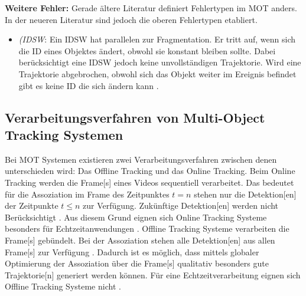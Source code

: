 \textbf{Weitere Fehler:}
Gerade ältere Literatur definiert Fehlertypen im \gls{MOT} anders. In der neueren Literatur sind jedoch die oberen Fehlertypen etabliert.

\begin{itemize}
    \item \textit{(\gls{IDSW}}: Ein \gls{IDSW} hat parallelen zur Fragmentation. Er tritt auf, wenn sich die \gls{ID} eines Objektes ändert, obwohl sie konstant bleiben sollte. Dabei berücksichtigt eine \gls{IDSW} jedoch keine unvollständigen \gls{Trajektorie}. Wird eine \gls{Trajektorie} abgebrochen, obwohl sich das Objekt weiter im \gls{Ereignis} befindet gibt es keine \acrshort{ID} die sich ändern kann \cite{CLEAR.2008, HOTA, IDF1}.
\end{itemize}

\subsection{Verarbeitungsverfahren von Multi-Object Tracking Systemen} \label{sec:MOT Verarbeitungsverfahren}
Bei \gls{MOT} Systemen existieren zwei Verarbeitungsverfahren zwischen denen unterschieden wird: Das \gls{Offline Tracking} und das \gls{Online Tracking}. Beim \gls{Online Tracking} werden die \gls{Frame}[s] eines Videos sequentiell verarbeitet. Das bedeutet für die \gls{Assoziation} im \gls{Frame} des Zeitpunktes \(t=n\) stehen nur die \gls{Detektion}[en] der Zeitpunkte \(t \leq n\)  zur Verfügung. Zukünftige \gls{Detektion}[en] werden nicht Berücksichtigt \cite{Luo.2022}. Aus diesem Grund eignen sich \gls{Online Tracking} Systeme besonders für Echtzeitanwendungen \cite{Bewley.2016}. \gls{Offline Tracking} Systeme verarbeiten die \gls{Frame}[s] gebündelt. Bei der \gls{Assoziation} stehen alle \gls{Detektion}[en] aus allen \gls{Frame}[s] zur Verfügung \cite{Luo.2022}. Dadurch ist es möglich, dass mittels globaler Optimierung der \gls{Assoziation} über die \gls{Frame}[s] qualitativ besonders gute \gls{Trajektorie}[n] generiert werden können. Für eine Echtzeitverarbeitung eignen sich \gls{Offline Tracking} Systeme nicht \cite{Luo.2022}. \par